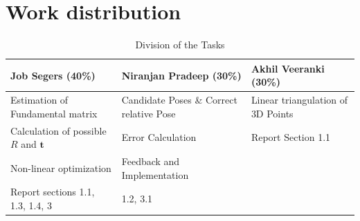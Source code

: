 \documentclass{article}
\begin{document}
\section{Work distribution}

\begin{table}[H]
    \centering 
    \caption{Division of the Tasks}
    \vspace{5pt}
    \begin{tabular}{@{} p{} p{} p{} @{}}
        \toprule
        \textbf{Job Segers (40\%)} & \textbf{Niranjan Pradeep (30\%)} & \textbf{Akhil Veeranki (30\%)} \\ 
        
        \midrule
            Estimation of Fundamental matrix & Candidate Poses \& Correct relative Pose & Linear triangulation of 3D Points \\
    Calculation of possible $R$ and $\mathbf{t}$ &Error Calculation & Report Section 1.1 \\
    Non-linear optimization & Feedback and Implementation & \\
    Report sections 1.1, 1.3, 1.4, 3 & 1.2, 3.1 & \\
        \bottomrule
    \end{tabular}
\end{table}
\end{document}
